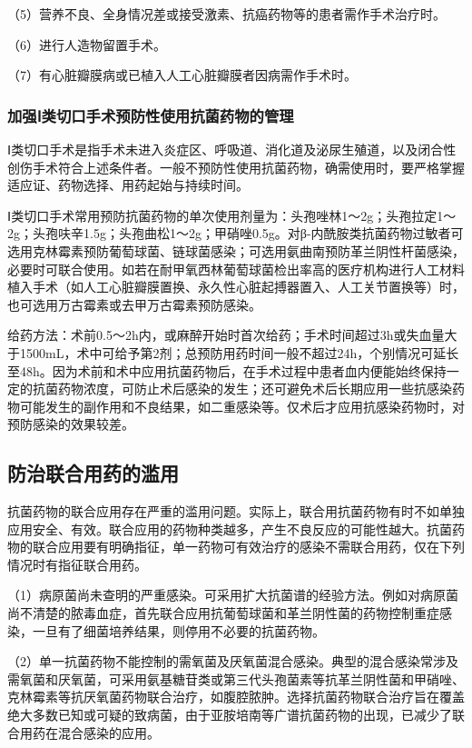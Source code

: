 （5）营养不良、全身情况差或接受激素、抗癌药物等的患者需作手术治疗时。

（6）进行人造物留置手术。

（7）有心脏瓣膜病或已植入人工心脏瓣膜者因病需作手术时。

\subsubsection{加强Ⅰ类切口手术预防性使用抗菌药物的管理}

Ⅰ类切口手术是指手术未进入炎症区、呼吸道、消化道及泌尿生殖道，以及闭合性创伤手术符合上述条件者。一般不预防性使用抗菌药物，确需使用时，要严格掌握适应证、药物选择、用药起始与持续时间。

Ⅰ类切口手术常用预防抗菌药物的单次使用剂量为：头孢唑林1～2g；头孢拉定1～2g；头孢呋辛1.5g；头孢曲松1～2g；甲硝唑0.5g。对β-内酰胺类抗菌药物过敏者可选用克林霉素预防葡萄球菌、链球菌感染；可选用氨曲南预防革兰阴性杆菌感染，必要时可联合使用。如若在耐甲氧西林葡萄球菌检出率高的医疗机构进行人工材料植入手术（如人工心脏瓣膜置换、永久性心脏起搏器置入、人工关节置换等）时，也可选用万古霉素或去甲万古霉素预防感染。

给药方法：术前0.5～2h内，或麻醉开始时首次给药；手术时间超过3h或失血量大于1500mL，术中可给予第2剂；总预防用药时间一般不超过24h，个别情况可延长至48h。因为术前和术中应用抗菌药物后，在手术过程中患者血内便能始终保持一定的抗菌药物浓度，可防止术后感染的发生；还可避免术后长期应用一些抗感染药物可能发生的副作用和不良结果，如二重感染等。仅术后才应用抗感染药物时，对预防感染的效果较差。

\subsection{防治联合用药的滥用}

抗菌药物的联合应用存在严重的滥用问题。实际上，联合用抗菌药物有时不如单独应用安全、有效。联合应用的药物种类越多，产生不良反应的可能性越大。抗菌药物的联合应用要有明确指征，单一药物可有效治疗的感染不需联合用药，仅在下列情况时有指征联合用药。

（1）病原菌尚未查明的严重感染。可采用扩大抗菌谱的经验方法。例如对病原菌尚不清楚的脓毒血症，首先联合应用抗葡萄球菌和革兰阴性菌的药物控制重症感染，一旦有了细菌培养结果，则停用不必要的抗菌药物。

（2）单一抗菌药物不能控制的需氧菌及厌氧菌混合感染。典型的混合感染常涉及需氧菌和厌氧菌，可采用氨基糖苷类或第三代头孢菌素等抗革兰阴性菌和甲硝唑、克林霉素等抗厌氧菌药物联合治疗，如腹腔脓肿。选择抗菌药物联合治疗旨在覆盖绝大多数已知或可疑的致病菌，由于亚胺培南等广谱抗菌药物的出现，已减少了联合用药在混合感染的应用。

